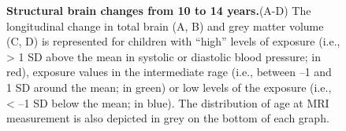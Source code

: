 \documentclass[
  letterpaper,
  DIV=11,
  numbers=noendperiod]{scrreport}
\begin{document}
\begin{figure}[H]


\caption{\label{fig-7.3}\textbf{Structural brain changes from 10 to 14
years.}\newline(A-D) The longitudinal change in total brain (A, B) and
grey matter volume (C, D) is represented for children with ``high''
levels of exposure (i.e., \textgreater{} 1 SD above the mean in systolic
or diastolic blood pressure; in red), exposure values in the
intermediate rage (i.e., between --1 and 1 SD around the mean; in green)
or low levels of the exposure (i.e., \textless{} --1 SD below the mean;
in blue). The distribution of age at MRI measurement is also depicted in
grey on the bottom of each graph.}

\end{figure}%
\end{document}
